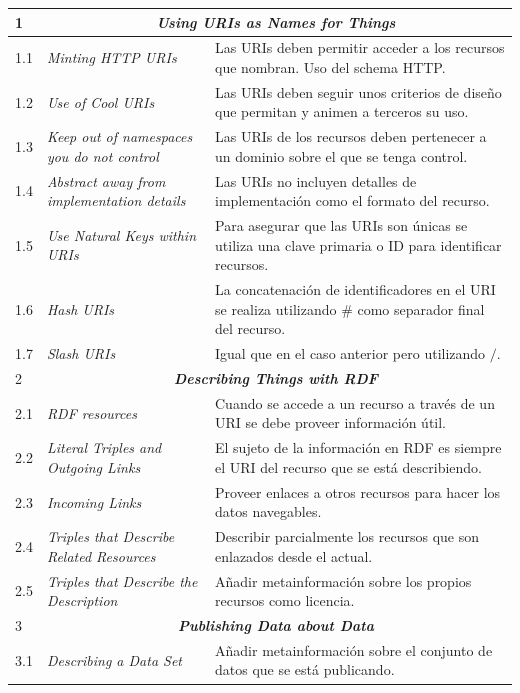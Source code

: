 \begin{longtable}[c]{|l|p{7cm}|p{8cm}|}
\endhead
   1& \multicolumn{2}{|c|}{\textbf{\textit{Using URIs as Names for Things}}}\\ \hline
   1.1 &  \textit{Minting \gls{HTTP URI}s} & Las URIs deben permitir acceder a los recursos que nombran. Uso del schema HTTP. \\ \hline
   1.2 &  \textit{Use of Cool URIs} &  Las URIs deben seguir unos criterios de diseño que permitan y animen a terceros su uso.\\ \hline
   1.3 &  \textit{Keep out of namespaces you do not control} &  Las URIs de los recursos deben pertenecer a un dominio sobre el que se tenga control.\\ \hline
   1.4 &  \textit{Abstract away from implementation details} & Las URIs no incluyen detalles de implementación como el formato del recurso. \\ \hline
   1.5 &  \textit{Use Natural Keys within URIs} &  Para asegurar que las URIs son únicas se utiliza una clave primaria o ID para identificar recursos.\\ \hline
   1.6 &  \textit{Hash URIs} &  La concatenación de identificadores en el URI se realiza utilizando \# como separador final del recurso.\\ \hline
   1.7 &  \textit{Slash URIs} &  Igual que en el caso anterior pero utilizando $/$. \\ \hline
   2&\multicolumn{2}{|c|}{\textbf{\textit{Describing Things with RDF}}}\\ \hline
   2.1 &  \textit{\gls{RDF} resources} & Cuando se accede a un recurso a través de un \gls{URI} se debe proveer información útil. \\ \hline
   2.2 &  \textit{Literal Triples and Outgoing Links} & El sujeto de la información en RDF es siempre el URI del recurso que se está describiendo. \\ \hline
   2.3 &  \textit{Incoming Links} & Proveer enlaces a otros recursos para hacer los datos navegables. \\ \hline
   2.4 &  \textit{Triples that Describe Related Resources} & Describir parcialmente los recursos que son enlazados desde el actual. \\ \hline
   2.5 &  \textit{Triples that Describe the Description} & Añadir metainformación sobre los propios recursos como licencia. \\ \hline
  3&\multicolumn{2}{|c|}{\textbf{\textit{Publishing Data about Data}}}\\ \hline
   3.1 &  \textit{Describing a Data Set} & Añadir metainformación sobre el conjunto de datos que se está publicando. \\ \hline

\end{longtable}
